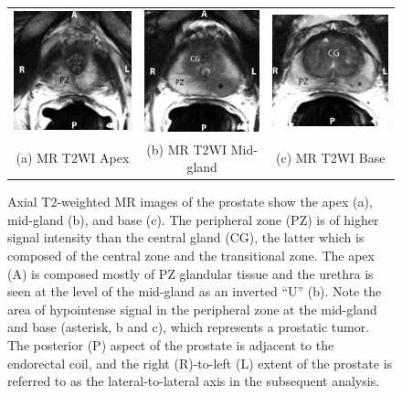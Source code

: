 \begin{figure}[htb!]
\centering
\begin{tabular}{ccc}
\includegraphics[width=0.29\linewidth]{figs/mr_anatomy/T2_apex} &
\includegraphics[width=0.275\linewidth]{figs/mr_anatomy/T2_midgland} &
\includegraphics[width=0.3\linewidth]{figs/mr_anatomy/T2_base} \\
(a) MR T2WI Apex & (b) MR T2WI Mid-gland & (c) MR T2WI Base \\
\end{tabular}
\caption{Axial T2-weighted MR images of the prostate show the apex (a),
    mid-gland (b), and base (c).  The peripheral zone (PZ) is of higher signal
    intensity than the central gland (CG), the latter which is composed of the
    central zone and the transitional zone. The apex (A) is composed mostly of
    PZ glandular tissue and the urethra is seen at the level of the mid-gland as
    an inverted ``U'' (b). Note the area of hypointense signal in the
    peripheral zone at the mid-gland and base (asterisk, b and c), which
    represents a prostatic tumor.  The posterior (P) aspect of the prostate is
    adjacent to the endorectal coil, and the right (R)-to-left (L) extent of
    the prostate is referred to as the lateral-to-lateral axis in the subsequent
    analysis.}
\label{fig:mr_anatomy} 
\end{figure}
